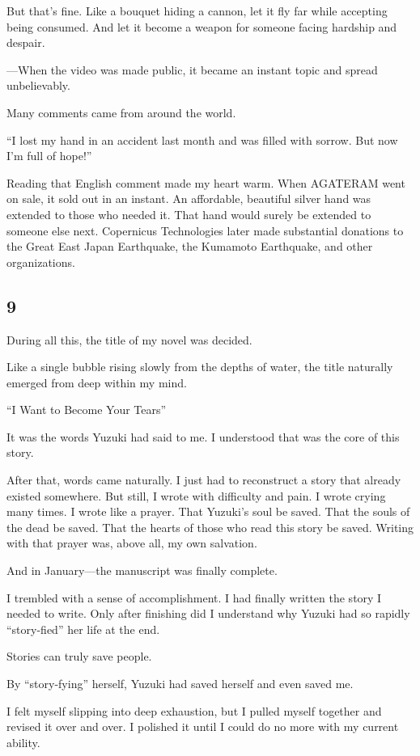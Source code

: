 \documentclass[
    a4paper,
    12pt,
    twoside,
    openany,
    UTF8,
    fontset=windows
]{ctexbook}
\begin{document}
But that's fine. Like a bouquet hiding a cannon, let it fly far while accepting being consumed. And let it become a weapon for someone facing hardship and despair.

---When the video was made public, it became an instant topic and spread unbelievably.

Many comments came from around the world.

``I lost my hand in an accident last month and was filled with sorrow. But now I'm full of hope!''

Reading that English comment made my heart warm. When AGATERAM went on sale, it sold out in an instant. An affordable, beautiful silver hand was extended to those who needed it. That hand would surely be extended to someone else next. Copernicus Technologies later made substantial donations to the Great East Japan Earthquake, the Kumamoto Earthquake, and other organizations.


\subsection*{9}

During all this, the title of my novel was decided.

Like a single bubble rising slowly from the depths of water, the title naturally emerged from deep within my mind.

``I Want to Become Your Tears''

It was the words Yuzuki had said to me. I understood that was the core of this story.

After that, words came naturally. I just had to reconstruct a story that already existed somewhere. But still, I wrote with difficulty and pain. I wrote crying many times. I wrote like a prayer. That Yuzuki's soul be saved. That the souls of the dead be saved. That the hearts of those who read this story be saved. Writing with that prayer was, above all, my own salvation.

And in January---the manuscript was finally complete.

I trembled with a sense of accomplishment. I had finally written the story I needed to write. Only after finishing did I understand why Yuzuki had so rapidly ``story-fied'' her life at the end.

Stories can truly save people.

By ``story-fying'' herself, Yuzuki had saved herself and even saved me.

I felt myself slipping into deep exhaustion, but I pulled myself together and revised it over and over. I polished it until I could do no more with my current ability.
\end{document}
